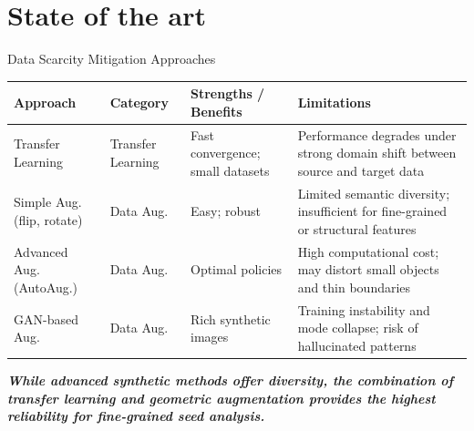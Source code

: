 \documentclass[aspectratio=169]{beamer}
\let\oldcite\cite %
\renewcommand{\cite}[1]{{\tiny\oldcite{#1}}}
\begin{document}
\section{State of the art}

\begin{frame}{Data Scarcity Mitigation Approaches}
    \begin{table}[H]
    \centering
    \tiny
    \setlength{\tabcolsep}{2pt}
    \begin{tabular}{@{}p{3cm}p{1.6cm}p{2.6cm}p{3.5cm}@{}}
    \toprule
    \textbf{Approach} & \textbf{Category} & \textbf{Strengths / Benefits} & \textbf{Limitations} \\
    \midrule
    Transfer Learning &
    Transfer Learning &
    Fast convergence; small datasets \cite{kornblith2019better} &
    Performance degrades under strong domain shift between source and target data \cite{jiang2022transferability} \\
    \addlinespace[2pt]
    Simple Aug. (flip, rotate) &
    Data Aug. &
    Easy; robust \cite{shorten2019survey} &
    Limited semantic diversity; insufficient for fine-grained or structural features \cite{chlap2021augmentation} \\
    \addlinespace[2pt]
    Advanced Aug. (AutoAug.) &
    Data Aug. &
    Optimal policies \cite{cubuk2019autoaugment} &
    High computational cost; may distort small objects and thin boundaries \cite{cubuk2019autoaugment} \\
    \addlinespace[2pt]
    GAN-based Aug. &
    Data Aug. &
    Rich synthetic images \cite{zeng2024image} &
    Training instability and mode collapse; risk of hallucinated patterns \cite{wang2021pitfalls_arxiv} \\
    \bottomrule
    \end{tabular}
    \end{table}
    
    \vspace{0.3cm}
    \small
    \textit{\textbf{While advanced synthetic methods offer diversity, the combination of transfer learning and geometric augmentation provides the highest reliability for fine-grained seed analysis.}}
\end{frame}
\end{document}
